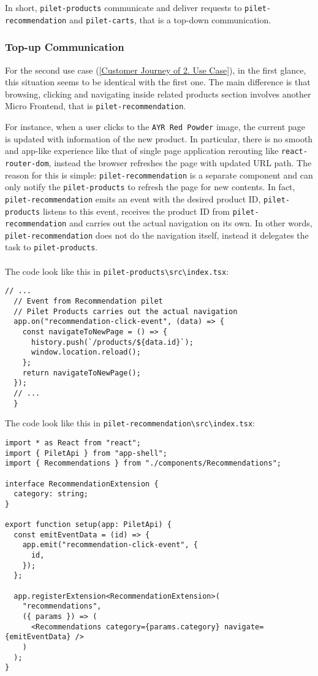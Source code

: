 \documentclass[a4paper]{book}
\begin{document}
In short, \verb|pilet-products| communicate and deliver requests to \verb|pilet-recommendation| and \verb|pilet-carts|, that is a top-down communication. 

\subsubsection{Top-up Communication} 
For the second use case (\ref{Customer Journey of 2. Use Case}), in the first glance, this situation seems to be identical with the first one. The main difference is that browsing, clicking and navigating inside related products section involves another Micro Frontend, that is \verb|pilet-recommendation|. 

For instance, when a user clicks to the \verb|AYR Red Powder| image, the current page is updated with information of the new product. In particular, there is no smooth and app-like experience like that of single page application rerouting like \verb|react-router-dom|, instead the browser refreshes the page with updated URL path. The reason for this is simple: \verb|pilet-recommendation| is a separate component and can only notify the \verb|pilet-products| to refresh the page for new contents. In fact, \verb|pilet-recommendation| emits an event with the desired product ID, \verb|pilet-products| listens to this event, receives the product ID from \verb|pilet-recommendation| and carries out the actual navigation on its own. In other words, \verb|pilet-recommendation| does not do the navigation itself, instead it delegates the task to \verb|pilet-products|. 
\\ \\
The code look like this in \verb|pilet-products\src\index.tsx|:
\begin{lstlisting}[caption={pilet-products listens to custom event and carries out the navigation}]
  // ...
  // Event from Recommendation pilet
  // Pilet Products carries out the actual navigation
  app.on("recommendation-click-event", (data) => {
    const navigateToNewPage = () => {
      history.push(`/products/${data.id}`);
      window.location.reload();
    };
    return navigateToNewPage();
  });
  // ...
  }
\end{lstlisting}


The code look like this in \verb|pilet-recommendation\src\index.tsx|:
\begin{lstlisting}[caption={pilet-recommendation emits custom event and transmits the product Id}]
import * as React from "react";
import { PiletApi } from "app-shell";
import { Recommendations } from "./components/Recommendations";

interface RecommendationExtension {
  category: string;
}

export function setup(app: PiletApi) {
  const emitEventData = (id) => {
    app.emit("recommendation-click-event", {
      id,
    });
  };

  app.registerExtension<RecommendationExtension>(
    "recommendations",
    ({ params }) => (
      <Recommendations category={params.category} navigate={emitEventData} />
    )
  );
}
\end{lstlisting}
\end{document}
